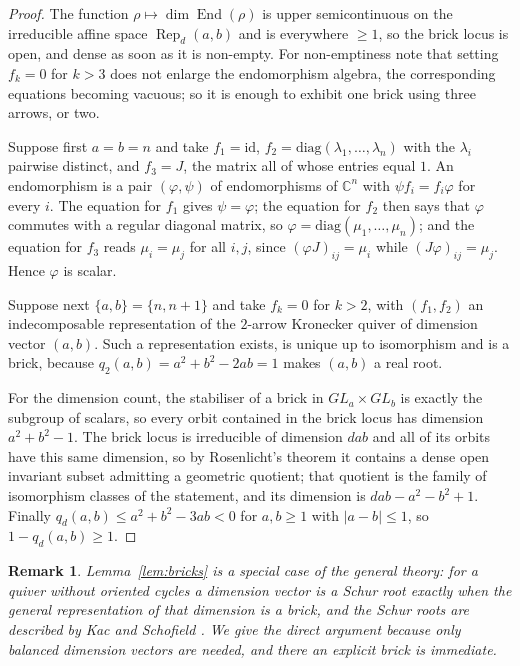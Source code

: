 \documentclass[10pt,a4paper]{amsart}
\newtheorem{remark}[theorem]{Remark}
\newcommand{\CC}{\mathbb{C}}
\newcommand{\End}{\operatorname{End}}
\newcommand{\Rep}{\operatorname{Rep}}
\begin{document}
\begin{proof}
The function $\rho\mapsto\dim\End(\rho)$ is upper semicontinuous on the irreducible affine space $\Rep_d(a,b)$ and is everywhere $\ge1$, so the brick locus is open, and dense as soon as it is non-empty. For non-emptiness note that setting $f_{k}=0$ for $k>3$ does not enlarge the endomorphism algebra, the corresponding equations becoming vacuous; so it is enough to exhibit one brick using three arrows, or two.

Suppose first $a=b=n$ and take $f_1=\mathrm{id}$, $f_2=\mathrm{diag}(\lambda_1,\dots,\lambda_n)$ with the $\lambda_i$ pairwise distinct, and $f_3=J$, the matrix all of whose entries equal $1$. An endomorphism is a pair $(\varphi,\psi)$ of endomorphisms of $\CC^n$ with $\psi f_i=f_i\varphi$ for every $i$. The equation for $f_1$ gives $\psi=\varphi$; the equation for $f_2$ then says that $\varphi$ commutes with a regular diagonal matrix, so $\varphi=\mathrm{diag}(\mu_1,\dots,\mu_n)$; and the equation for $f_3$ reads $\mu_i=\mu_j$ for all $i,j$, since $(\varphi J)_{ij}=\mu_i$ while $(J\varphi)_{ij}=\mu_j$. Hence $\varphi$ is scalar.

Suppose next $\{a,b\}=\{n,n+1\}$ and take $f_k=0$ for $k>2$, with $(f_1,f_2)$ an indecomposable representation of the $2$-arrow Kronecker quiver of dimension vector $(a,b)$. Such a representation exists, is unique up to isomorphism and is a brick, because $q_2(a,b)=a^2+b^2-2ab=1$ makes $(a,b)$ a real root.

For the dimension count, the stabiliser of a brick in $GL_a\times GL_b$ is exactly the subgroup of scalars, so every orbit contained in the brick locus has dimension $a^2+b^2-1$. The brick locus is irreducible of dimension $dab$ and all of its orbits have this same dimension, so by Rosenlicht's theorem it contains a dense open invariant subset admitting a geometric quotient; that quotient is the family of isomorphism classes of the statement, and its dimension is $dab-a^2-b^2+1$. Finally $q_d(a,b)\le a^2+b^2-3ab<0$ for $a,b\ge1$ with $|a-b|\le1$, so $1-q_d(a,b)\ge1$.
\end{proof}

\begin{remark}
Lemma~\ref{lem:bricks} is a special case of the general theory: for a quiver without oriented cycles a dimension vector is a Schur root exactly when the general representation of that dimension is a brick, and the Schur roots are described by Kac \cite{Kac80} and Schofield \cite{Sch92}. We give the direct argument because only balanced dimension vectors are needed, and there an explicit brick is immediate.
\end{remark}
\end{document}
